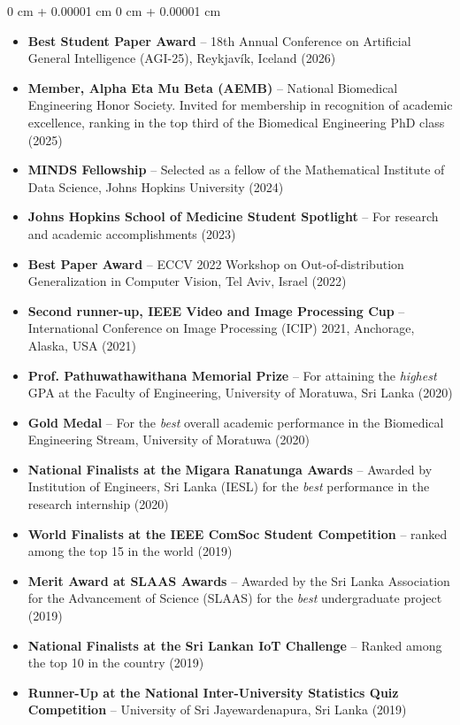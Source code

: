 \documentclass[10pt, letterpaper]{article}
\newenvironment{highlights}{
    \begin{itemize}[
        topsep=0.10 cm,
        parsep=0.10 cm,
        partopsep=0pt,
        itemsep=0pt,
        leftmargin=0 cm + 10pt
    ]
}{
    \end{itemize}
} %
\newenvironment{onecolentry}{
    \begin{adjustwidth}{
        0 cm + 0.00001 cm
    }{
        0 cm + 0.00001 cm
    }
}{
    \end{adjustwidth}
} %
\begin{document}
    \begin{onecolentry}
        \begin{highlights}  
            \item \textbf{Best Student Paper Award} -- 18th Annual Conference on Artificial General Intelligence (AGI-25), Reykjavík, Iceland (2026)
            \item \textbf{Member, Alpha Eta Mu Beta (AEMB)} -- National Biomedical Engineering Honor Society. Invited for membership in recognition of academic excellence, ranking in the top third of the Biomedical Engineering PhD class (2025)
            \item \textbf{MINDS Fellowship} -- Selected as a fellow of the Mathematical Institute of Data Science, Johns Hopkins University (2024)
            \item \textbf{Johns Hopkins School of Medicine Student Spotlight} -- For research and academic accomplishments (2023)
            \item \textbf{Best Paper Award} -- ECCV 2022 Workshop on Out-of-distribution Generalization in Computer Vision, Tel Aviv, Israel (2022)
            \item \textbf{Second runner-up, IEEE Video and Image Processing Cup} -- International Conference on Image Processing (ICIP) 2021, Anchorage, Alaska, USA (2021)
            \item \textbf{Prof. Pathuwathawithana Memorial Prize} -- For attaining the \emph{highest} GPA at the Faculty of Engineering, University of Moratuwa, Sri Lanka (2020)
            \item \textbf{Gold Medal} -- For the \emph{best} overall academic performance in the Biomedical Engineering Stream, University of Moratuwa (2020)
            \item \textbf{National Finalists at the Migara Ranatunga Awards} -- Awarded by Institution of Engineers, Sri Lanka (IESL) for the \emph{best} performance in the research internship (2020)
            \item \textbf{World Finalists at the IEEE ComSoc Student Competition} -- ranked among the top 15 in the world (2019)
            \item \textbf{Merit Award at SLAAS Awards} -- Awarded by the Sri Lanka Association for the Advancement of Science (SLAAS) for the \emph{best} undergraduate project (2019)
            \item \textbf{National Finalists at the Sri Lankan IoT Challenge} -- Ranked among the top 10 in the country (2019)
            \item \textbf{Runner-Up at the National Inter-University Statistics Quiz Competition} -- University of Sri Jayewardenapura, Sri Lanka (2019)

\end{highlights}
\end{onecolentry}
\end{document}
